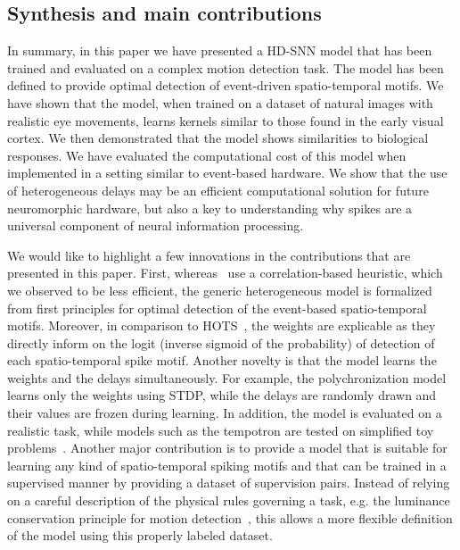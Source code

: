 \documentclass[default]{sn-jnl}%
\theoremstyle{thmstyleone}%
\theoremstyle{thmstyletwo}%
\theoremstyle{thmstylethree}%
\begin{document}
\subsection{Synthesis and main contributions}
In summary, in this paper we have presented a HD-SNN model that has been trained and evaluated on a complex motion detection task. The model has been defined to provide optimal detection of event-driven spatio-temporal motifs. We have shown that the model, when trained on a dataset of natural images with realistic eye movements, learns kernels similar to those found in the early visual cortex. We then demonstrated that the model shows similarities to biological responses. We have evaluated the computational cost of this model when implemented in a setting similar to event-based hardware. We show that the use of heterogeneous delays may be an efficient computational solution for future neuromorphic hardware, but also a key to understanding why spikes are a universal component of neural information processing.

We would like to highlight a few innovations in the contributions that are presented in this paper. First, whereas~\citep{ghosh_spatiotemporal_2019,yu_stsc-snn_2022} use a correlation-based heuristic, which we observed to be less efficient, the generic heterogeneous model is formalized from first principles for optimal detection of the event-based spatio-temporal motifs. Moreover, in comparison to HOTS~\citep{lagorce_hots_2017}, the weights are explicable as they directly inform on the logit (inverse sigmoid of the probability) of detection of each spatio-temporal spike motif. Another novelty is that the model learns the weights and the delays simultaneously. For example, the polychronization model~\citep{izhikevich_polychronization_2006} learns only the weights using STDP, while the delays are randomly drawn and their values are frozen during learning. In addition, the model is evaluated on a realistic task, while models such as the tempotron are tested on simplified toy problems~\citep{gutig_tempotron_2006}. Another major contribution is to provide a model that is suitable for learning any kind of spatio-temporal spiking motifs and that can be trained in a supervised manner by providing a dataset of supervision pairs. Instead of relying on a careful description of the physical rules governing a task, e.g. the luminance conservation principle for motion detection~\citep{benosman_asynchronous_2012, dardelet_event-by-event_2021}, this allows a more flexible definition of the model using this properly labeled dataset.
%
\end{document}

